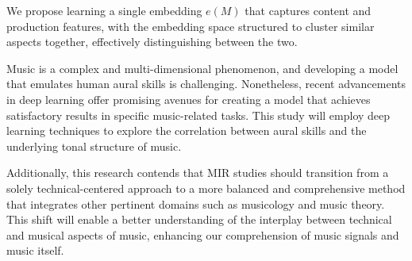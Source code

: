 We propose learning a single embedding $e(M)$ that captures content and production features, with the embedding space structured to cluster similar aspects together, effectively distinguishing between the two.

Music is a complex and multi-dimensional phenomenon, and developing a model that emulates human aural skills is challenging. Nonetheless, recent advancements in deep learning offer promising avenues for creating a model that achieves satisfactory results in specific music-related tasks. This study will employ deep learning techniques to explore the correlation between aural skills and the underlying tonal structure of music.

Additionally, this research contends that MIR studies should transition from a solely technical-centered approach to a more balanced and comprehensive method that integrates other pertinent domains such as musicology and music theory. This shift will enable a better understanding of the interplay between technical and musical aspects of music, enhancing our comprehension of music signals and music itself.

